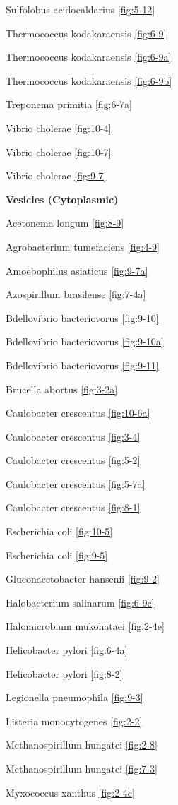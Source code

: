 \documentclass[]{tufte-book}
\begin{document}
Sulfolobus acidocaldarius \ref{fig:5-12}

Thermococcus kodakaraensis \ref{fig:6-9}

Thermococcus kodakaraensis \ref{fig:6-9a}

Thermococcus kodakaraensis \ref{fig:6-9b}

Treponema primitia \ref{fig:6-7a}

Vibrio cholerae \ref{fig:10-4}

Vibrio cholerae \ref{fig:10-7}

Vibrio cholerae \ref{fig:9-7}

\textbf{Vesicles (Cytoplasmic)}

Acetonema longum \ref{fig:8-9}

Agrobacterium tumefaciens \ref{fig:4-9}

Amoebophilus asiaticus \ref{fig:9-7a}

Azospirillum brasilense \ref{fig:7-4a}

Bdellovibrio bacteriovorus \ref{fig:9-10}

Bdellovibrio bacteriovorus \ref{fig:9-10a}

Bdellovibrio bacteriovorus \ref{fig:9-11}

Brucella abortus \ref{fig:3-2a}

Caulobacter crescentus \ref{fig:10-6a}

Caulobacter crescentus \ref{fig:3-4}

Caulobacter crescentus \ref{fig:5-2}

Caulobacter crescentus \ref{fig:5-7a}

Caulobacter crescentus \ref{fig:8-1}

Escherichia coli \ref{fig:10-5}

Escherichia coli \ref{fig:9-5}

Gluconacetobacter hansenii \ref{fig:9-2}

Halobacterium salinarum \ref{fig:6-9c}

Halomicrobium mukohataei \ref{fig:2-4e}

Helicobacter pylori \ref{fig:6-4a}

Helicobacter pylori \ref{fig:8-2}

Legionella pneumophila \ref{fig:9-3}

Listeria monocytogenes \ref{fig:2-2}

Methanospirillum hungatei \ref{fig:2-8}

Methanospirillum hungatei \ref{fig:7-3}

Myxococcus xanthus \ref{fig:2-4c}
\end{document}
